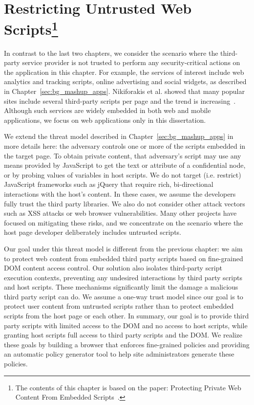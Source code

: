 \chapter[Restricting Untrusted Web Scripts] {Restricting Untrusted Web Scripts\footnote{The contents of this chapter is based on the paper: Protecting Private Web Content From Embedded Scripts~\cite{Zhou-ESORICS}.}}
\label{sec:esorics}

In contrast to the last two chapters, we consider the scenario where the third-party service provider is not trusted to perform any security-critical actions on the application in this chapter.  For example, the services of interest include web analytics and tracking scripts, online advertising and social widgets, as described in Chapter~\ref{sec:bg_mashup_apps}.  Nikiforakis et al. showed that many popular sites include several third-party scripts per page and the trend is increasing~\cite{Nikiforakis:2012:YYI:2382196.2382274}.  Although such services are widely embedded in both web and mobile applications, we focus on web applications only in this dissertation.  

  We extend the threat model described in Chapter~\ref{sec:bg_mashup_apps} in more details here: the adversary controls one or more of the scripts embedded in the target page.  To obtain private content, that adversary's script may use any means provided by JavaScript to get the text or attribute of a confidential node, or by probing values of variables in host scripts.  We do not target (i.e. restrict) JavaScript frameworks such as jQuery that require rich, bi-direct\-ion\-al interactions with the host's content.  In these cases, we assume the developers fully trust the third party libraries.  We also do not consider other attack vectors such as XSS attacks or web browser vulnerabilities.  Many other projects have focused on mitigating these risks, and we concentrate on the scenario where the host page developer deliberately includes untrusted scripts.

Our goal under this threat model is different from the previous chapter: we aim to protect web content from embedded third party scripts based on fine-grained DOM content access control.  Our solution also isolates third-party script execution contexts, preventing any undesired interactions by third party scripts and host scripts.  These mechanisms significantly limit the damage a malicious third party script can do.  We assume a one-way trust model since our goal is to protect user content from untrusted scripts rather than to protect embedded scripts from the host page or each other.  In summary, our goal is to provide third party scripts with limited access to the DOM and no access to host scripts, while granting host scripts full access to third party scripts and the DOM.  We realize these goals by building a browser that enforces fine-grained policies and providing an automatic policy generator tool to help site administrators generate these policies.  

